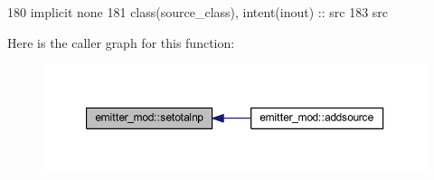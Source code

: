 \begin{DoxyCode}
180     \textcolor{keywordtype}{implicit none}
181     \textcolor{keywordtype}{class}(source\_class), \textcolor{keywordtype}{intent(inout)} :: src
183     src%
\end{DoxyCode}
Here is the caller graph for this function\+:\nopagebreak
\begin{figure}[H]
\begin{center}
\leavevmode
\includegraphics[width=350pt]{namespaceemitter__mod_a5c219dd6692a761ad4bf968ae750fcc6_icgraph}
\end{center}
\end{figure}
